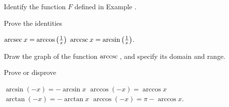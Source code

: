 \begin{exercises}
Identify the function $F$ defined in Example
.

Prove the identities
\begin{exenum}
\x
$\mathrm{arcsec\:} x = \arccos \left(\frac1x\right)$
\x
$\mathrm{arccsc\:} x = \arcsin \left(\frac1x\right)$.
\end{exenum}

Draw the graph of the function $\mathrm{arccsc\:}$,
and specify its domain and range.

Prove or disprove
\begin{exenum}
\x
$\arcsin(-x) = -\arcsin x$
\x
$\arccos(-x) = \arccos x$
\x
$\arctan(-x) = -\arctan x$
\x
$\arccos(-x) = \pi - \arccos x$.
\end{exenum}

\end{exercises}
